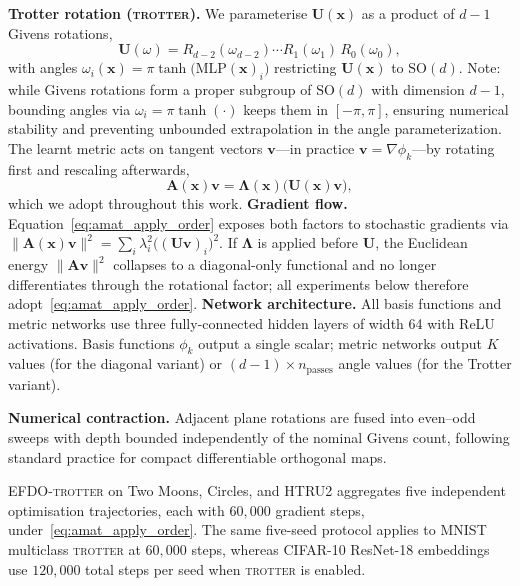 \documentclass{article}
\theoremstyle{plain}
\theoremstyle{definition}
\theoremstyle{remark}
\newcommand{\new}[1]{#1}
\begin{document}
\textbf{Trotter rotation (\textsc{trotter}).} We parameterise $\mathbf{U}(\mathbf{x})$ as a product of $d{-}1$ Givens rotations,
\begin{equation}
    \mathbf{U}(\omega) = R_{d-2}(\omega_{d-2})\cdots R_1(\omega_1)\,R_0(\omega_0),
\end{equation}
with angles $\omega_i(\mathbf{x})=\pi\tanh\bigl(\mathrm{MLP}(\mathbf{x})_i\bigr)$ restricting $\mathbf{U}(\mathbf{x})$ to $\mathrm{SO}(d)$.
\new{Note: while Givens rotations form a proper subgroup of $\mathrm{SO}(d)$ with dimension $d{-}1$,
bounding angles via $\omega_i = \pi\tanh(\cdot)$ keeps them in $[-\pi,\pi]$, ensuring numerical stability
and preventing unbounded extrapolation in the angle parameterization.}
The learnt metric acts on tangent vectors $\mathbf{v}$---in practice $\mathbf{v}=\nabla\phi_k$---by rotating first and rescaling afterwards,
\begin{equation}
    \label{eq:amat_apply_order}
    \mathbf{A}(\mathbf{x})\mathbf{v} = \boldsymbol{\Lambda}(\mathbf{x})\big(\mathbf{U}(\mathbf{x})\mathbf{v}\big),
\end{equation}
which we adopt throughout this work.
\textbf{Gradient flow.}
Equation~\eqref{eq:amat_apply_order} exposes both factors to stochastic gradients via $\|\mathbf{A}(\mathbf{x})\mathbf{v}\|^2=\sum_i \lambda_i^2\big((\mathbf{U}\mathbf{v})_i\big)^2$.
If $\boldsymbol{\Lambda}$ is applied before $\mathbf{U}$, the Euclidean energy $\|\mathbf{A}\mathbf{v}\|^2$ collapses to a diagonal-only functional and no longer differentiates through the rotational factor; all experiments below therefore adopt~\eqref{eq:amat_apply_order}.
\textbf{Network architecture.}
\new{All basis functions and metric networks use three fully-connected hidden layers of width 64 with ReLU activations.
Basis functions $\phi_k$ output a single scalar; metric networks output $K$ values (for the diagonal variant)
or $(d-1) \times n_{\mathrm{passes}}$ angle values (for the Trotter variant).}

\textbf{Numerical contraction.}
Adjacent plane rotations are fused into even--odd sweeps with depth bounded independently of the nominal Givens count, following standard practice for compact differentiable orthogonal maps.

EFDO-\textsc{trotter} on Two Moons, Circles, and HTRU2 aggregates five independent optimisation trajectories, each with $60{,}000$ gradient steps, under~\eqref{eq:amat_apply_order}.
The same five-seed protocol applies to MNIST multiclass \textsc{trotter} at $60{,}000$ steps, whereas CIFAR-10 ResNet-18 embeddings use $120{,}000$ total steps per seed when \textsc{trotter} is enabled.
\end{document}
